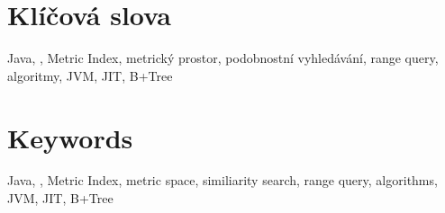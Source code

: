 \section*{Klíčová slova}
Java, \MIndex{}, Metric Index, metrický prostor, podobnostní vyhledávání, range query, algoritmy, JVM, JIT, B+Tree
\section*{Keywords}
Java, \MIndex{}, Metric Index, metric space, similiarity search, range query, algorithms, JVM, JIT, B+Tree
\newpage